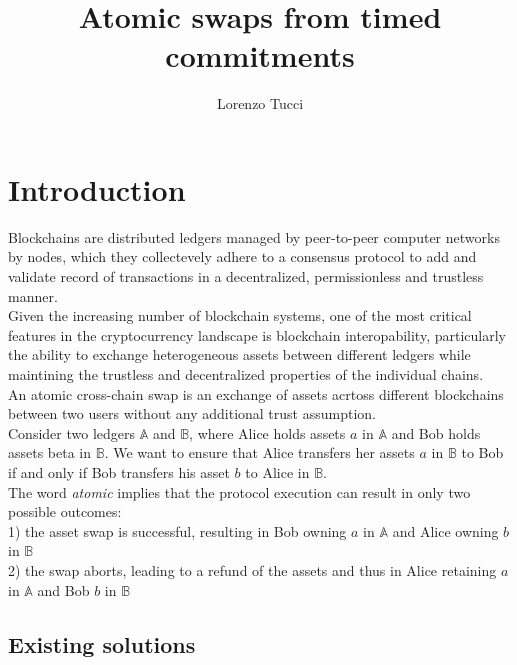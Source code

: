 \documentclass{article}      	%
\begin{document}
         
\author{Lorenzo Tucci}
\title{Atomic swaps from timed commitments}

\maketitle

\tableofcontents
\section{Introduction}

Blockchains are distributed ledgers managed by peer-to-peer computer networks by nodes, which they collectevely adhere to a consensus protocol to add and validate record of transactions in a decentralized, permissionless and trustless manner. \\
Given the increasing number of blockchain systems, one of the most critical features in the cryptocurrency landscape is blockchain interopability, particularly the ability to exchange heterogeneous assets between different ledgers while maintining the trustless and decentralized properties of the individual chains. \\

An atomic cross-chain swap is an exchange of assets acrtoss different blockchains between two users without any additional trust assumption. \\
Consider two ledgers $\mathbb{A}$ and $\mathbb{B}$, where Alice holds assets $a$ in $\mathbb{A}$ and Bob holds assets beta in $\mathbb{B}$. We want to ensure that Alice transfers her assets $a$ in $\mathbb{B}$ to Bob if and only if Bob transfers his asset $b$ to Alice in $\mathbb{B}$. \\

The word \textit{atomic} implies that the protocol execution can result in only two possible outcomes: \\
1) the asset swap is successful, resulting in Bob owning $a$ in $\mathbb{A}$ and Alice owning $b$ in $\mathbb{B}$ \\
2) the swap aborts, leading to a refund of the assets and thus in Alice retaining $a$ in $\mathbb{A}$ and Bob $b$ in $\mathbb{B}$ \\

\subsection{Existing solutions}
\end{document}
